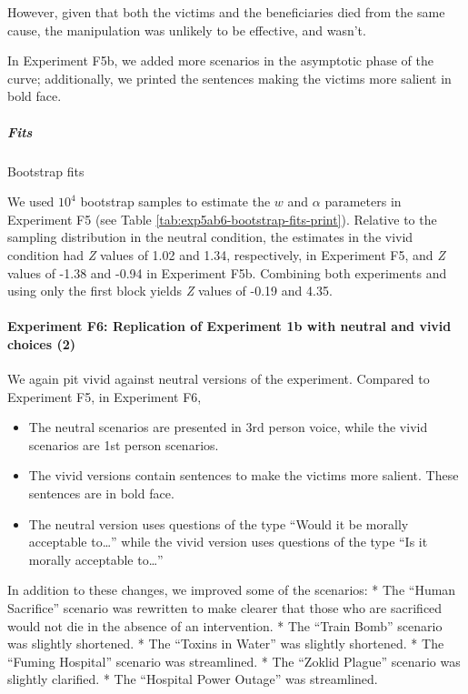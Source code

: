 \documentclass[
]{article}
\providecommand{\tightlist}{%
  \setlength{\itemsep}{0pt}\setlength{\parskip}{0pt}}
\begin{document}
However, given that both the victims and the beneficiaries died from the same cause, the manipulation was unlikely to be effective, and wasn't.

In Experiment F5b, we added more scenarios in the asymptotic phase of the curve; additionally, we printed the sentences making the victims more salient in bold face.

\clearpage

\subparagraph{Fits}\label{fits}

Bootstrap fits

We used \ensuremath{10^{4}} bootstrap samples to estimate the \(w\) and \(\alpha\) parameters in Experiment F5 (see Table \ref{tab:exp5ab6-bootstrap-fits-print}). Relative to the sampling distribution in the neutral condition, the estimates in the vivid condition had \emph{Z} values of 1.02 and 1.34, respectively, in Experiment F5, and \emph{Z} values of -1.38 and -0.94 in Experiment F5b. Combining both experiments and using only the first block yields \emph{Z} values of -0.19 and 4.35.

\clearpage

\paragraph{Experiment F6: Replication of Experiment 1b with neutral and vivid choices (2)}\label{experiment-f6-replication-of-experiment-1b-with-neutral-and-vivid-choices-2}

We again pit vivid against neutral versions of the experiment. Compared to Experiment F5, in Experiment F6,

\begin{itemize}
\tightlist
\item
  The neutral scenarios are presented in 3rd person voice, while the vivid scenarios are 1st person scenarios.
\item
  The vivid versions contain sentences to make the victims more salient. These sentences are in bold face.
\item
  The neutral version uses questions of the type ``Would it be morally acceptable to\ldots{}'' while the vivid version uses questions of the type ``Is it morally acceptable to\ldots{}''
\end{itemize}

In addition to these changes, we improved some of the scenarios: * The ``Human Sacrifice'' scenario was rewritten to make clearer that those who are sacrificed would not die in the absence of an intervention. * The ``Train Bomb'' scenario was slightly shortened. * The ``Toxins in Water'' was slightly shortened. * The ``Fuming Hospital'' scenario was streamlined. * The ``Zoklid Plague'' scenario was slightly clarified. * The ``Hospital Power Outage'' was streamlined.
\end{document}
